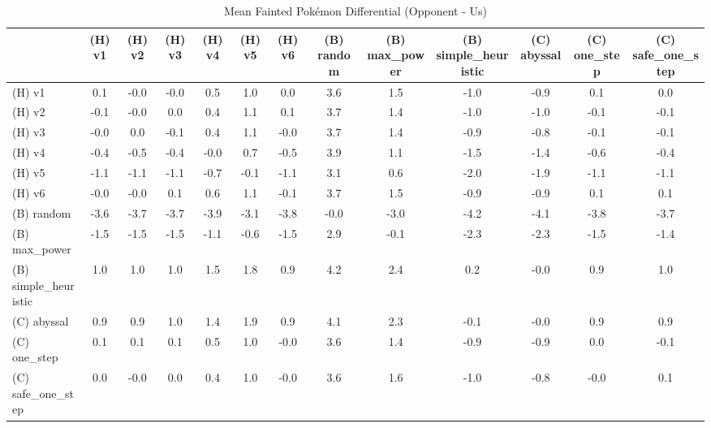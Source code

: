 \begin{table}[htbp]
\caption{Mean Fainted Pokémon Differential (Opponent - Us)}
\label{tab:fainted_diff}
\begin{tabular}{lcccccccccccc}
\hline
 & (H) v1 & (H) v2 & (H) v3 & (H) v4 & (H) v5 & (H) v6 & (B) random & (B) max\_power & (B) simple\_heuristic & (C) abyssal & (C) one\_step & (C) safe\_one\_step \\
\hline
(H) v1 & 0.1 & -0.0 & -0.0 & 0.5 & 1.0 & 0.0 & 3.6 & 1.5 & -1.0 & -0.9 & 0.1 & 0.0 \\
(H) v2 & -0.1 & -0.0 & 0.0 & 0.4 & 1.1 & 0.1 & 3.7 & 1.4 & -1.0 & -1.0 & -0.1 & -0.1 \\
(H) v3 & -0.0 & 0.0 & -0.1 & 0.4 & 1.1 & -0.0 & 3.7 & 1.4 & -0.9 & -0.8 & -0.1 & -0.1 \\
(H) v4 & -0.4 & -0.5 & -0.4 & -0.0 & 0.7 & -0.5 & 3.9 & 1.1 & -1.5 & -1.4 & -0.6 & -0.4 \\
(H) v5 & -1.1 & -1.1 & -1.1 & -0.7 & -0.1 & -1.1 & 3.1 & 0.6 & -2.0 & -1.9 & -1.1 & -1.1 \\
(H) v6 & -0.0 & -0.0 & 0.1 & 0.6 & 1.1 & -0.1 & 3.7 & 1.5 & -0.9 & -0.9 & 0.1 & 0.1 \\
(B) random & -3.6 & -3.7 & -3.7 & -3.9 & -3.1 & -3.8 & -0.0 & -3.0 & -4.2 & -4.1 & -3.8 & -3.7 \\
(B) max\_power & -1.5 & -1.5 & -1.5 & -1.1 & -0.6 & -1.5 & 2.9 & -0.1 & -2.3 & -2.3 & -1.5 & -1.4 \\
(B) simple\_heuristic & 1.0 & 1.0 & 1.0 & 1.5 & 1.8 & 0.9 & 4.2 & 2.4 & 0.2 & -0.0 & 0.9 & 1.0 \\
(C) abyssal & 0.9 & 0.9 & 1.0 & 1.4 & 1.9 & 0.9 & 4.1 & 2.3 & -0.1 & -0.0 & 0.9 & 0.9 \\
(C) one\_step & 0.1 & 0.1 & 0.1 & 0.5 & 1.0 & -0.0 & 3.6 & 1.4 & -0.9 & -0.9 & 0.0 & -0.1 \\
(C) safe\_one\_step & 0.0 & -0.0 & 0.0 & 0.4 & 1.0 & -0.0 & 3.6 & 1.6 & -1.0 & -0.8 & -0.0 & 0.1 \\
\hline
\end{tabular}
\end{table}
